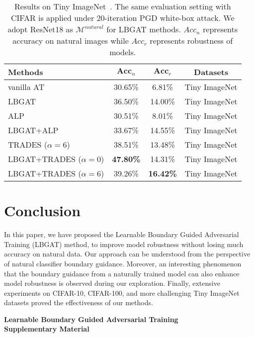 \documentclass[10pt,twocolumn,letterpaper]{article}
\begin{document}
\begin{table}[h]
	\centering
	\caption{Results on Tiny ImageNet~\cite{DBLP:conf/cvpr/DengDSLL009}. The same evaluation setting with CIFAR is applied under 20-iteration PGD white-box attack. We adopt ResNet18 as $\mathcal{M}^{natural}$ for LBGAT methods. $Acc_{n}$ represents accuracy on natural images while $Acc_{r}$ represents robustness of models.} 
	\resizebox{.99\linewidth}{!}
	{
	\begin{tabular}{l|c|c|c}
		\textbf{Methods} &$\textbf{Acc}_{n}$ &$\textbf{Acc}_{r}$ &\textbf{Datasets} \\
		\hline
		\hline
		vanilla AT  &30.65\% &6.81\%  &Tiny ImageNet\\
		LBGAT       &36.50\% &14.00\% &Tiny ImageNet \\
		ALP         &30.51\% &8.01\% &Tiny ImageNet \\
		LBGAT+ALP   &33.67\% &14.55\% &Tiny ImageNet \\
		TRADES ($\alpha=6$)  &38.51\% &13.48\% &Tiny ImageNet \\
		LBGAT+TRADES ($\alpha=0$) &\textbf{47.80\%} &14.31\% &Tiny ImageNet \\
		LBGAT+TRADES ($\alpha=6$) &39.26\% &\textbf{16.42\%} &Tiny ImageNet \\
		\hline
		\hline
	\end{tabular}
	\label{tab:Tiny_ImageNet}
    }
\vspace{-0.1in}
\end{table}

\section{Conclusion}
In this paper, we have proposed the Learnable Boundary Guided Adversarial Training (LBGAT) method, to improve model robustness without losing much accuracy on natural data. Our approach can be understood from the perspective of natural classifier boundary guidance. Moreover, an interesting phenomenon that the boundary guidance from a naturally trained model can also enhance model robustness is observed during our exploration. Finally, extensive experiments on CIFAR-10, CIFAR-100, and more challenging Tiny ImageNet datasets proved the effectiveness of our methods.

{\small


}

\newpage
\onecolumn
\appendix

\begin{center}
	\Large \textbf{Learnable Boundary Guided Adversarial Training}
	\Large \\ \textbf{Supplementary Material}
\end{center}
\vspace{20pt}
\end{document}
